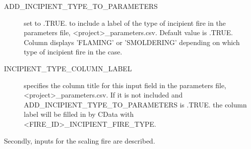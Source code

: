 \documentclass[12pt,twoside]{book}
\begin{document}
\begin{description}
  \item[ADD\_INCIPIENT\_TYPE\_TO\_PARAMETERS] set to .TRUE. to include a label of the type of incipient fire in the parameters file, {\ct <project>\_parameters.csv}. Default value is .TRUE. Column displays 'FLAMING' or 'SMOLDERING' depending on which type of incipient fire in the case.
  \item[INCIPIENT\_TYPE\_COLUMN\_LABEL] specifies the column title for this input field in the parameters file, {\ct <project>\_parameters.csv}. If it is not included and \\
{\ct ADD\_INCIPIENT\_TYPE\_TO\_PARAMETERS} is .TRUE. the column label will be filled in by CData with {\ct <FIRE\_ID>\_INCIPIENT\_FIRE\_TYPE}.
 \end{description}
Secondly, inputs for the scaling fire are described.
\end{document}
